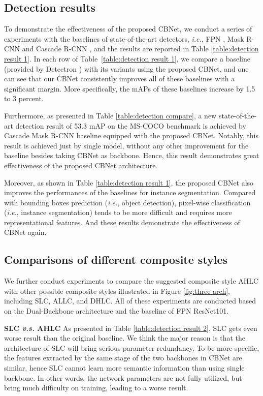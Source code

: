 \documentclass[letterpaper]{article} \usepackage{aaai20}  \usepackage{multirow}
\begin{document}
\subsection{Detection results}


To demonstrate the effectiveness of the proposed CBNet, we conduct a series of experiments with the baselines of state-of-the-art detectors, \textit{i.e.}, FPN \cite{lin2017feature}, Mask R-CNN \cite{he2017mask} and Cascade R-CNN \cite{cai18cascadercnn}, and the results are reported in Table \ref{table:detection result 1}. In each row of Table~\ref{table:detection result 1}, we compare a baseline (provided by Detectron \cite{Detectron2018}) with its variants using the proposed CBNet, and one can see that our CBNet consistently improves all of these baselines with a significant margin. More specifically, the mAPs of these baselines increase by 1.5 to 3 percent.

Furthermore, as presented in Table \ref{table:detection compare}, a new state-of-the-art detection result of 53.3 mAP on the MS-COCO benchmark is achieved by Cascade Mask R-CNN baseline equipped with the proposed CBNet. Notably, this result is achieved just by single model, without any other improvement for the baseline besides taking CBNet as backbone. Hence, this result demonstrates great effectiveness of the proposed CBNet architecture. 




Moreover, as shown in Table \ref{table:detection result 1}, the proposed CBNet also improves the performances of the baselines for instance segmentation. Compared with bounding boxes prediction (\textit{i.e.}, object detection), pixel-wise classification (\textit{i.e.}, instance segmentation) tends to be more difficult and requires more representational features. And these results demonstrate the effectiveness of CBNet again.



\subsection{Comparisons of different composite styles}


We further conduct experiments to compare the suggested composite style AHLC with other possible composite styles illustrated in Figure \ref{fig:three arch}, including SLC, ALLC, and DHLC. All of these experiments are conducted based on the Dual-Backbone architecture and the baseline of FPN ResNet101.

\textbf{SLC \textit{v.s.} AHLC}
As presented in Table \ref{table:detection result 2}, SLC gets even worse result than the original baseline. We think the major reason is that the architecture of SLC will bring serious parameter redundancy. To be more specific, the features extracted by the same stage of the two backbones in CBNet are similar, hence SLC cannot learn more semantic information than using single backbone. In other words, the network parameters are not fully utilized, but bring much difficulty on training, leading to a worse result.
\end{document}

